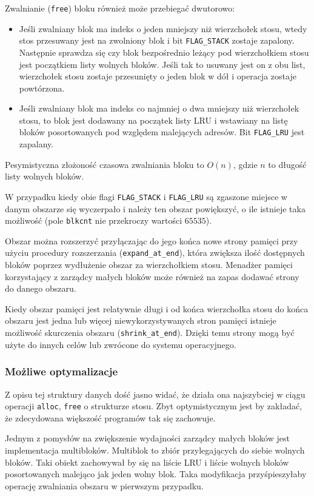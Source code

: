 \documentclass[12pt,a4paper,titlepage,twoside]{mwart}
\begin{document}
Zwalnianie (\verb+free+) bloku również może przebiegać dwutorowo:
\begin{itemize}
\item Jeśli zwalniany blok ma indeks o jeden mniejszy niż wierzchołek stosu,
wtedy stos przesuwany jest na zwolniony blok i bit \verb+FLAG_STACK+ zostaje
zapalony. Następnie sprawdza się czy blok bezpośrednio leżący pod wierzchołkiem
stosu jest początkiem listy wolnych bloków. Jeśli tak to usuwany jest on z obu
list, wierzchołek stosu zostaje przesunięty o jeden blok w dół i operacja
zostaje powtórzona.
\item Jeśli zwalniany blok ma indeks co najmniej o dwa mniejszy niż wierzchołek
stosu, to blok jest dodawany na początek listy LRU i wstawiany na listę bloków
posortowanych pod względem malejących adresów. Bit \verb+FLAG_LRU+ jest
zapalany.
\end{itemize}

Pesymistyczna złożoność czasowa zwalniania bloku to $O(n)$, gdzie $n$ to
długość listy wolnych bloków.

W przypadku kiedy obie flagi \verb+FLAG_STACK+ i \verb+FLAG_LRU+ są zgaszone
miejsce w danym obszarze się wyczerpało i należy ten obszar powiększyć, o ile
istnieje taka możliwość (pole \verb+blkcnt+ nie przekroczy wartości $65535$).

Obszar można rozszerzyć przyłączając do jego końca nowe strony pamięci przy
użyciu procedury rozszerzania (\verb+expand_at_end+), która zwiększa ilość
dostępnych bloków poprzez wydłużenie obszar za wierzchołkiem stosu. Menadżer
pamięci korzystający z zarządcy małych bloków może również na zapas dodawać
strony do danego obszaru.

Kiedy obszar pamięci jest relatywnie długi i od końca wierzchołka stosu do
końca obszaru jest jedna lub więcej niewykorzystywanych stron pamięci istnieje
możliwość skurczenia obszaru (\verb+shrink_at_end+). Dzięki temu strony mogą
być użyte do innych celów lub zwrócone do systemu operacyjnego.

\subsubsection{Możliwe optymalizacje}

Z opisu tej struktury danych dość jasno widać, że działa ona najszybciej w
ciągu operacji \verb+alloc+, \verb+free+ o strukturze stosu. Zbyt
optymistycznym jest by zakładać, że zdecydowana większość programów tak się
zachowuje.

Jednym z pomysłów na zwiększenie wydajności zarządcy małych bloków jest
implementacja multibloków. Multiblok to zbiór przylegających do siebie wolnych
bloków. Taki obiekt zachowywał by się na liście LRU i liście wolnych bloków
posortowanych malejąco jak jeden wolny blok. Taka modyfikacja przyśpieszyłaby
operację zwalniania obszaru w pierwszym przypadku.
\end{document}
